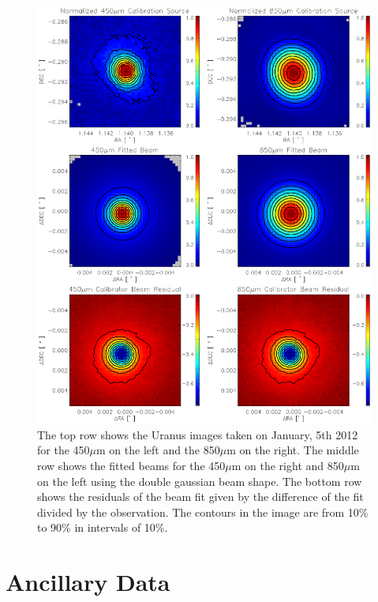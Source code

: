 \begin{figure}
  \centering
  \includegraphics[width=1.\textwidth, trim={0 5cm 0 0}]{obs_imgs/calib_beams.eps}
  \caption[SCUBA-2 Calibration and Beams]{The top row shows the Uranus images taken on January, 5th 2012 for the 450$\mu$m on the left and the 850$\mu$m on the right.  The middle row shows the fitted beams for the 450$\mu$m on the right and 850$\mu$m on the left using the double gaussian beam shape. The bottom row shows the residuals of the beam fit given by the difference of the fit divided by the observation.  The contours in the image are from 10\% to 90\% in intervals of 10\%.}
    \label{fig_calib}
\end{figure}

\section{Ancillary Data}

